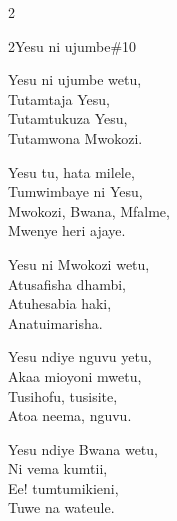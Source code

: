 \begin{multicols}{2}
\begin{hymn}{2}{Yesu ni ujumbe}{\#10}
\begin{stanza}
Yesu ni ujumbe wetu,\\
Tutamtaja Yesu,\\
Tutamtukuza Yesu,\\
Tutamwona Mwokozi.
\end{stanza}
\begin{chorus}
Yesu tu, hata milele,\\
Tumwimbaye ni Yesu,\\
Mwokozi, Bwana, Mfalme,\\
Mwenye heri ajaye.
\end{chorus}
\begin{stanza}
Yesu ni Mwokozi wetu,\\
Atusafisha dhambi,\\
Atuhesabia haki,\\
Anatuimarisha.
\end{stanza}
\begin{stanza}
Yesu ndiye nguvu yetu,\\
Akaa mioyoni mwetu,\\
Tusihofu, tusisite,\\
Atoa neema, nguvu.
\end{stanza}
\begin{stanza}
Yesu ndiye Bwana wetu,\\
Ni vema kumtii,\\
Ee! tumtumikieni,\\
Tuwe na wateule.
\end{stanza}
\end{hymn}


\end{multicols}

